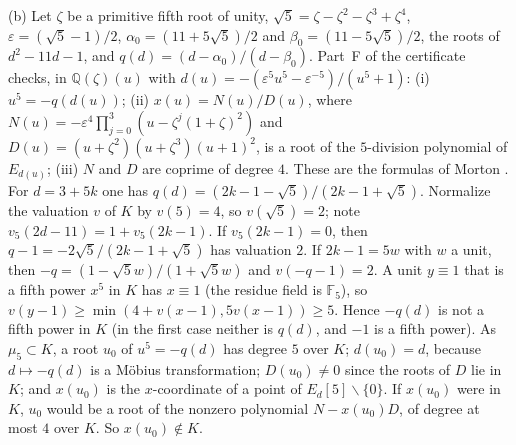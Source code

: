 \documentclass[11pt]{article}
\newcommand{\Q}{\mathbb Q}
\newcommand{\F}{\mathbb F}
\begin{document}
(b) Let \(\zeta\) be a primitive fifth root of unity, \(\sqrt5=\zeta-\zeta^2-\zeta^3+\zeta^4\),
\(\varepsilon=(\sqrt5-1)/2\), \(\alpha_0=(11+5\sqrt5)/2\) and \(\beta_0=(11-5\sqrt5)/2\), the roots of
\(d^2-11d-1\), and \(q(d)=(d-\alpha_0)/(d-\beta_0)\). Part~F of the certificate checks, in \(\Q(\zeta)(u)\) with
\(d(u)=-(\varepsilon^5u^5-\varepsilon^{-5})/(u^5+1)\): (i) \(u^5=-q(d(u))\); (ii) \(x(u)=N(u)/D(u)\), where
\(N(u)=-\varepsilon^4\prod_{j=0}^{3}(u-\zeta^j(1+\zeta)^2)\) and \(D(u)=(u+\zeta^2)(u+\zeta^3)(u+1)^2\), is a root of
the \(5\)-division polynomial of \(E_{d(u)}\); (iii) \(N\) and \(D\) are coprime of degree \(4\). These are the
formulas of Morton \cite{Mo}. For \(d=3+5k\) one has \(q(d)=(2k-1-\sqrt5)/(2k-1+\sqrt5)\). Normalize the valuation
\(v\) of \(K\) by \(v(5)=4\), so \(v(\sqrt5)=2\); note \(v_5(2d-11)=1+v_5(2k-1)\). If \(v_5(2k-1)=0\), then
\(q-1=-2\sqrt5/(2k-1+\sqrt5)\) has valuation \(2\). If \(2k-1=5w\) with \(w\) a unit, then
\(-q=(1-\sqrt5w)/(1+\sqrt5w)\) and \(v(-q-1)=2\). A unit \(y\equiv1\) that is a fifth power \(x^5\) in \(K\) has
\(x\equiv1\) (the residue field is \(\F_5\)), so \(v(y-1)\ge\min(4+v(x-1),5v(x-1))\ge5\). Hence \(-q(d)\) is not a
fifth power in \(K\) (in the first case neither is \(q(d)\), and \(-1\) is a fifth power). As \(\mu_5\subset K\), a
root \(u_0\) of \(u^5=-q(d)\) has degree \(5\) over \(K\); \(d(u_0)=d\), because \(d\mapsto-q(d)\) is a Möbius
transformation; \(D(u_0)\neq0\) since the roots of \(D\) lie in \(K\); and \(x(u_0)\) is the \(x\)-coordinate of a
point of \(E_d[5]\smallsetminus\{0\}\). If \(x(u_0)\) were in \(K\), \(u_0\) would be a root of the nonzero
polynomial \(N-x(u_0)D\), of degree at most \(4\) over \(K\). So \(x(u_0)\notin K\).
\end{document}
